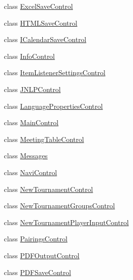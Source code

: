 \begin{DoxyCompactItemize}
\item 
class \hyperlink{classde_1_1turnierverwaltung_1_1control_1_1_excel_save_control}{Excel\+Save\+Control}
\item 
class \hyperlink{classde_1_1turnierverwaltung_1_1control_1_1_h_t_m_l_save_control}{H\+T\+M\+L\+Save\+Control}
\item 
class \hyperlink{classde_1_1turnierverwaltung_1_1control_1_1_i_calendar_save_control}{I\+Calendar\+Save\+Control}
\item 
class \hyperlink{classde_1_1turnierverwaltung_1_1control_1_1_info_control}{Info\+Control}
\item 
class \hyperlink{classde_1_1turnierverwaltung_1_1control_1_1_item_listener_settings_control}{Item\+Listener\+Settings\+Control}
\item 
class \hyperlink{classde_1_1turnierverwaltung_1_1control_1_1_j_n_l_p_control}{J\+N\+L\+P\+Control}
\item 
class \hyperlink{classde_1_1turnierverwaltung_1_1control_1_1_language_properties_control}{Language\+Properties\+Control}
\item 
class \hyperlink{classde_1_1turnierverwaltung_1_1control_1_1_main_control}{Main\+Control}
\item 
class \hyperlink{classde_1_1turnierverwaltung_1_1control_1_1_meeting_table_control}{Meeting\+Table\+Control}
\item 
class \hyperlink{classde_1_1turnierverwaltung_1_1control_1_1_messages}{Messages}
\item 
class \hyperlink{classde_1_1turnierverwaltung_1_1control_1_1_navi_control}{Navi\+Control}
\item 
class \hyperlink{classde_1_1turnierverwaltung_1_1control_1_1_new_tournament_control}{New\+Tournament\+Control}
\item 
class \hyperlink{classde_1_1turnierverwaltung_1_1control_1_1_new_tournament_groups_control}{New\+Tournament\+Groups\+Control}
\item 
class \hyperlink{classde_1_1turnierverwaltung_1_1control_1_1_new_tournament_player_input_control}{New\+Tournament\+Player\+Input\+Control}
\item 
class \hyperlink{classde_1_1turnierverwaltung_1_1control_1_1_pairings_control}{Pairings\+Control}
\item 
class \hyperlink{classde_1_1turnierverwaltung_1_1control_1_1_p_d_f_output_control}{P\+D\+F\+Output\+Control}
\item 
class \hyperlink{classde_1_1turnierverwaltung_1_1control_1_1_p_d_f_save_control}{P\+D\+F\+Save\+Control}

\end{DoxyCompactItemize}
